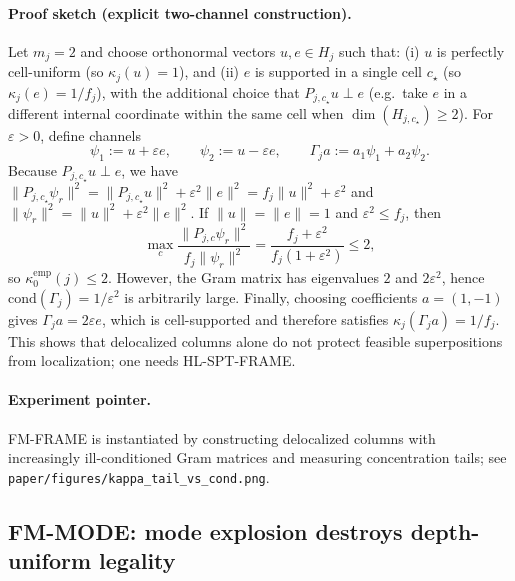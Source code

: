 \documentclass[11pt]{article}
\begin{document}
\paragraph{Proof sketch (explicit two-channel construction).}
Let $m_j=2$ and choose orthonormal vectors $u,e\in H_j$ such that:
(i) $u$ is perfectly cell-uniform (so $\kappa_j(u)=1$), and
(ii) $e$ is supported in a single cell $c_\star$ (so $\kappa_j(e)=1/f_j$),
with the additional choice that $P_{j,c_\star}u\perp e$ (e.g.\ take $e$ in a different internal coordinate within the same cell when $\dim(H_{j,c_\star})\ge 2$).
For $\varepsilon>0$, define channels
\[
\psi_1 := u + \varepsilon e,
\qquad
\psi_2 := u - \varepsilon e,
\qquad
\Gamma_j a := a_1\psi_1+a_2\psi_2.
\]
Because $P_{j,c_\star}u\perp e$, we have $\|P_{j,c_\star}\psi_r\|^2=\|P_{j,c_\star}u\|^2+\varepsilon^2\|e\|^2=f_j\|u\|^2+\varepsilon^2$ and $\|\psi_r\|^2=\|u\|^2+\varepsilon^2\|e\|^2$.
If $\|u\|=\|e\|=1$ and $\varepsilon^2\le f_j$, then
\[
\max_c\frac{\|P_{j,c}\psi_r\|^2}{f_j\|\psi_r\|^2}
=
\frac{f_j+\varepsilon^2}{f_j(1+\varepsilon^2)}
\le 2,
\]
so $\kappa_0^{\mathrm{emp}}(j)\le 2$.
However, the Gram matrix has eigenvalues $2$ and $2\varepsilon^2$, hence $\mathrm{cond}(\Gamma_j)=1/\varepsilon^2$ is arbitrarily large.
Finally, choosing coefficients $a=(1,-1)$ gives $\Gamma_j a = 2\varepsilon e$, which is cell-supported and therefore satisfies $\kappa_j(\Gamma_j a)=1/f_j$.
This shows that delocalized columns alone do not protect feasible superpositions from localization; one needs HL-SPT-FRAME.

\paragraph{Experiment pointer.}
FM-FRAME is instantiated by constructing delocalized columns with increasingly ill-conditioned Gram matrices and measuring concentration tails; see \nolinkurl{paper/figures/kappa_tail_vs_cond.png}.

\subsection{FM-MODE: mode explosion destroys depth-uniform legality}
\end{document}
